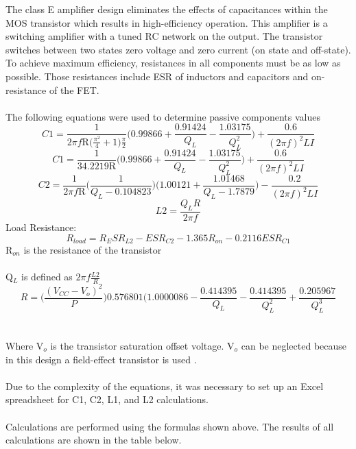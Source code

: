 \documentclass[12pt]{article}
\begin{document}
\indent
The class E amplifier design eliminates the effects of capacitances within the MOS transistor which results in high-efficiency operation. This amplifier is a switching amplifier with a tuned RC network on the output. The transistor switches between two states zero voltage and zero current (on state and off-state). To achieve maximum efficiency, resistances in all components must be as low as possible. Those resistances include ESR of inductors and capacitors and on-resistance of the FET.\\
\hfill\\
The following equations were used to determine passive components values
\begin{equation}
C1 = \frac{1}{2\pi f \mathrm{R}\big(\frac{\pi^2}{4} + 1 \big)\frac{\pi}{2}}\big(0.99866+\frac{0.91424}{Q_L}-\frac{1.03175}{Q_L^2}\big) + \frac{0.6}{(2\pi f)^2LI}
\end{equation}
\begin{equation}
C1 = \frac{1}{34.2219 \mathrm{R}}\big(0.99866+\frac{0.91424}{Q_L}-\frac{1.03175}{Q_L^2}\big) + \frac{0.6}{(2\pi f)^2LI}
\end{equation}
\begin{equation}
C2 = \frac{1}{2\pi f\mathrm{R}}\big(\frac{1}{Q_L - 0.104823}\big)\big(1.00121 + \frac{1.01468}{Q_L-1.7879}\big)-\frac{0.2}{(2\pi f)^2LI}
\end{equation}
\begin{equation}
L2 = \frac{Q_LR}{2\pi f}
\end{equation}
Load Resistance:
\begin{equation}
R_{load} = R _ ESR_{L2} - ESR_{C2} - 1.365 R_{on} - 0.2116 ESR_{C1}
\end{equation}
R$_{on}$ is the resistance of the transistor\\
\hfill \\
Q$_L$ is defined as $2\pi f \frac{L2}{R}$
\begin{equation}
R = \big(\frac{(V_{CC}-V_o)^2}{P}\big) 0.576801 \big( 1.0000086 - \frac{0.414395}{Q_L} - \frac{0.414395}{Q_L^2} + \frac{0.205967}{Q_L^3}
\end{equation}\\
\hfill \\
Where V$_o$ is the transistor saturation offset voltage.  V$_o$ can be neglected because in this design a field-effect transistor is used \cite{classepower}.\\
\hfill \\
Due to the complexity of the equations, it was necessary to set up an Excel spreadsheet for C1, C2, L1, and L2 calculations.\\
\hfill \\
Calculations are performed using the formulas shown above. The results of all calculations are shown in the table below.\\
\hfill \\
\end{document}
